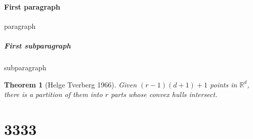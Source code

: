 \documentclass[12pt, a4paper, oneside]{article}
\newtheorem{theorem}{Theorem}
\newcommand{\rr}{\mathbb{R}}
\begin{document}
\newpage


\paragraph{First paragraph}
paragraph

\subparagraph{First subparagraph}
subparagraph

\begin{theorem}[Helge Tverberg 1966]
    Given $(r-1)(d+1)+1$ points in $\rr^d$, there is a partition of them into $r$ parts whose convex hulls intersect.
\end{theorem}



\newpage
\section{3333}


\newpage
\end{document}
